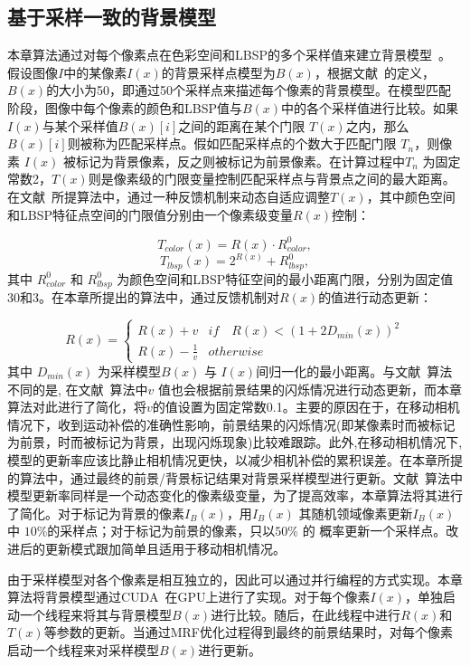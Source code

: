 \subsection{基于采样一致的背景模型}
\label {ch4:sec:sub:scam}

本章算法通过对每个像素点在色彩空间和LBSP的多个采样值来建立背景模型~\cite{subsenseTIP}。假设图像$I$中的某像素$I(x)$的背景采样点模型为$B(x)$，根据文献~的定义，$B(x)$的大小为50，即通过50个采样点来描述每个像素的背景模型。在模型匹配阶段，图像中每个像素的颜色和LBSP值与$B(x)$中的各个采样值进行比较。如果$I(x)$与某个采样值$B(x)[i]$之间的距离在某个门限 $T(x)$之内，那么$B(x)[i]$则被称为匹配采样点。假如匹配采样点的个数大于匹配门限 $ T_{n}$，则像素 $I(x)$ 被标记为背景像素，反之则被标记为前景像素。在计算过程中$T_{n}$ 为固定常数2，$T(x)$则是像素级的门限变量控制匹配采样点与背景点之间的最大距离。在文献~所提算法中，通过一种反馈机制来动态自适应调整$T(x)$，其中颜色空间和LBSP特征点空间的门限值分别由一个像素级变量$R(x)$控制：


$$T_{color}(x) = R(x) \cdot R^{0}_{color},$$
$$T_{lbsp}(x) = 2^{R(x)} + R^{0}_{lbsp},$$
其中 $R^{0}_{color}$ 和 $R^{0}_{lbsp}$ 为颜色空间和LBSP特征空间的最小距离门限，分别为固定值30和3\cite{subsenseTIP}。在本章所提出的算法中，通过反馈机制对$R(x)$的值进行动态更新：

$$ R(x) = \begin{cases}  R(x)+v & if \quad {R(x)<(1+2D_{min}(x))}^{2} \\  R(x) - \frac{1 }{v } & otherwise \end{cases}$$
其中 $D_{min}(x)$ 为采样模型$B(x)$ 与 $I(x)$间归一化的最小距离。与文献~算法不同的是, 在文献~算法中$v$ 值也会根据前景结果的闪烁情况进行动态更新，而本章算法对此进行了简化，将$v$的值设置为固定常数0.1。主要的原因在于，在移动相机情况下，收到运动补偿的准确性影响，前景结果的闪烁情况(即某像素时而被标记为前景，时而被标记为背景，出现闪烁现象)比较难跟踪。此外,在移动相机情况下, 模型的更新率应该比静止相机情况更快，以减少相机补偿的累积误差。在本章所提的算法中，通过最终的前景/背景标记结果对背景采样模型进行更新。文献~算法中模型更新率同样是一个动态变化的像素级变量，为了提高效率，本章算法将其进行了简化。对于标记为背景的像素$I_{B}(x)$，用$I_{B}(x)$ 其随机领域像素更新$I_{B}(x)$中 $10\%$的采样点；对于标记为前景的像素，只以$50\% $ 的 概率更新一个采样点。改进后的更新模式跟加简单且适用于移动相机情况。 \par
由于采样模型对各个像素是相互独立的，因此可以通过并行编程的方式实现。本章算法将背景模型通过CUDA~\cite{CUDA}在GPU上进行了实现。对于每个像素$I(x)$，单独启动一个线程来将其与背景模型$B(x)$进行比较。随后，在此线程中进行$R(x)$和 $T(x)$等参数的更新。当通过MRF优化过程得到最终的前景结果时，对每个像素启动一个线程来对采样模型$B(x)$进行更新。

